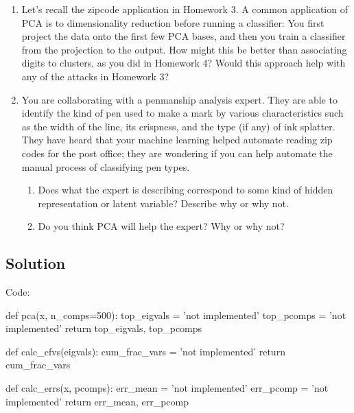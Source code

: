 \documentclass[submit]{harvardml}
\begin{document}
\begin{problem}
\begin{enumerate}
\item Let's recall the zipcode application in Homework 3.  A common
  application of PCA is to dimensionality reduction before running a
  classifier: You first project the data onto the first few PCA bases,
  and then you train a classifier from the projection to the output.
  How might this be better than associating digits to clusters, as you
  did in Homework 4?  Would this approach help with any of the attacks
  in Homework 3?

\item You are collaborating with a penmanship analysis expert.  They
  are able to identify the kind of pen used to make a mark by various
  characteristics such as the width of the line, its crispness, and
  the type (if any) of ink splatter.  They have heard that your
  machine learning helped automate reading zip codes for the post
  office; they are wondering if you can help automate the manual
  process of classifying pen types.
  \begin{enumerate}
    \item Does what the expert is describing correspond to some kind
      of hidden representation or latent variable?  Describe why or
      why not.
    \item Do you think PCA will help the expert?  Why or why not?
      
  \end{enumerate}
\end{enumerate}
\end{problem}

\subsection*{Solution}
Code:

\begin{python}
def pca(x, n_comps=500):
    top_eigvals = 'not implemented'
    top_pcomps = 'not implemented'
    return top_eigvals, top_pcomps


def calc_cfvs(eigvals):
    cum_frac_vars = 'not implemented'
    return cum_frac_vars


def calc_errs(x, pcomps):
    err_mean = 'not implemented'
    err_pcomp = 'not implemented'
    return err_mean, err_pcomp
\end{python}
\end{document}
